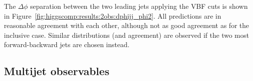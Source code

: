 The $\Delta\phi$ separation between the two leading jets applying the
VBF cuts is shown in
Figure~\ref{fig:higgscomp:results:2obs:dphijj_phi2}. All predictions
are in reasonable agreement with each other, although not as good
agreement as for the inclusive case. Similar distributions (and
agreement) are observed if the two most forward-backward jets are
chosen instead.




\clearpage
\subsection{Multijet observables}
\label{sec:hjetscomp:results:mjobs}

